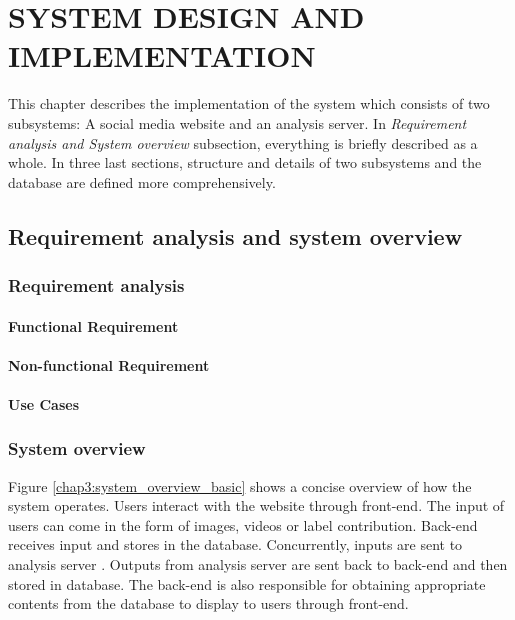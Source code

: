 \chapter{SYSTEM DESIGN AND IMPLEMENTATION}

This chapter describes the implementation of the system which consists of two subsystems: A social media website and an analysis server. In \textit{Requirement analysis and System overview} subsection, everything is briefly described as a whole. In three last sections, structure and details of two subsystems and the database are defined more comprehensively.

\section{Requirement analysis and system overview}
\subsection{Requirement analysis}
\subsubsection{Functional Requirement}
\subsubsection{Non-functional Requirement}
\subsubsection{Use Cases}

\subsection{System overview}
Figure \ref{chap3:system_overview_basic} shows a concise overview of how the system operates. Users interact with the website through front-end. The input of users can come in the form of images, videos or label contribution. Back-end receives input and stores in the database. Concurrently, inputs are sent to analysis server . Outputs from analysis server are sent back to back-end and then stored in database. The back-end is also responsible for obtaining appropriate contents from the database to display to users through front-end.

